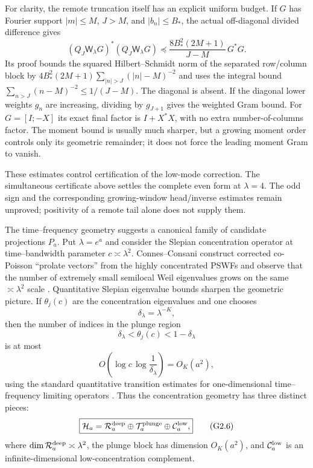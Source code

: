 \documentclass[11pt]{article}
\theoremstyle{remark}
\begin{document}
For clarity, the remote truncation itself has an explicit uniform
budget. If $G$ has Fourier support $|m|\le M$, $J>M$, and
$|b_n|\le B_*$, the actual off-diagonal divided difference gives
\begin{equation}\label{eq:v120-separated-uniform-budget}
 (Q_J\mathsf W_\lambda G)^*(Q_J\mathsf W_\lambda G)
 \preceq\frac{8B_*^2(2M+1)}{J-M}\,G^*G.
\end{equation}
Its proof bounds the squared Hilbert--Schmidt norm of the separated
row/column block by
$4B_*^2(2M+1)\sum_{|n|>J}(|n|-M)^{-2}$ and uses the
integral bound $\sum_{n>J}(n-M)^{-2}\le1/(J-M)$.
The diagonal is absent. If the diagonal lower weights $g_n$ are increasing,
dividing by $g_{J+1}$ gives the weighted Gram bound. For
$G=[I;-X]$ its exact final factor is $I+X^*X$, with no extra
number-of-columns factor. The moment bound is usually much sharper,
but a growing moment order controls only its geometric remainder;
it does not force the leading moment Gram to vanish.

These estimates control certification of the low-mode correction.
The simultaneous certificate above settles the complete even form at
$\lambda=4$. The odd sign and the corresponding growing-window
head/inverse estimates remain unproved; positivity of a remote tail
alone does not supply them.


The time--frequency geometry suggests a canonical family of candidate projections $P_a$.  Put $\lambda=e^a$ and consider the Slepian concentration operator at time--bandwidth parameter $c\asymp\lambda^2$.  Connes--Consani construct corrected co-Poisson ``prolate vectors'' from the highly concentrated PSWFs and observe that the number of extremely small semilocal Weil eigenvalues grows on the same $\asymp\lambda^2$ scale \cite{ConnesConsani2023}.  Quantitative Slepian eigenvalue bounds sharpen the geometric picture.  If $\theta_j(c)$ are the concentration eigenvalues and one chooses
\[
 \delta_\lambda=\lambda^{-K},
\]
then the number of indices in the plunge region
\[
 \delta_\lambda<\theta_j(c)<1-\delta_\lambda
\]
is at most
\[
 O\!\left(\log c\,\log\frac1{\delta_\lambda}\right)=O_K(a^2),
 \tag{G2.5}
\]
using the standard quantitative transition estimates for one-dimensional time--frequency limiting operators \cite{SlepianTransition}.  Thus the concentration geometry has three distinct pieces:
\[
 \boxed{
 \mathcal H_a
 =\mathcal R_a^{\rm deep}\oplus
   \mathcal T_a^{\rm plunge}\oplus
   \mathcal C_a^{\rm low},
 }
 \tag{G2.6}
\]
where $\dim\mathcal R_a^{\rm deep}\asymp\lambda^2$, the plunge block has dimension $O_K(a^2)$, and $\mathcal C_a^{\rm low}$ is an infinite-dimensional low-concentration complement.
\end{document}

